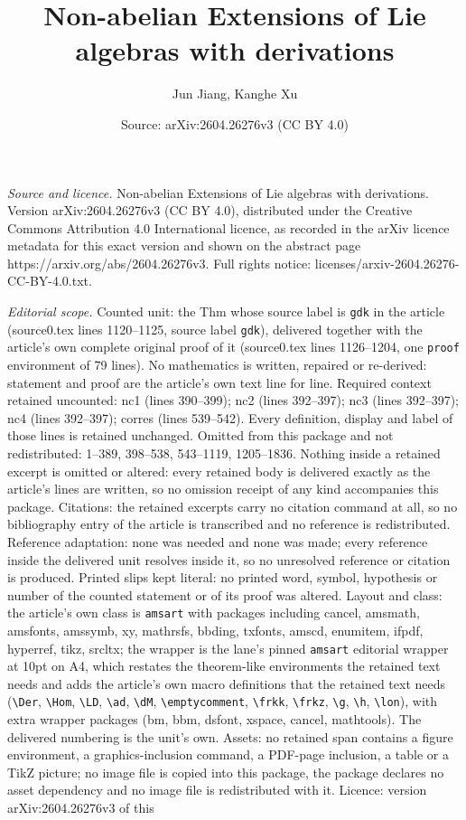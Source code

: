 \documentclass[10pt,a4paper]{amsart}
\title[Non-abelian Extensions of Lie algebras with derivations]{Non-abelian Extensions of Lie algebras with derivations}
\author{Jun Jiang, Kanghe Xu}
\date{Source: arXiv:2604.26276v3 (CC BY 4.0)}
\begin{document}
\maketitle

\noindent\emph{Source and licence.} Non-abelian Extensions of Lie algebras with derivations. Version arXiv:2604.26276v3 (CC BY 4.0), distributed under the Creative Commons Attribution 4.0 International licence, as recorded in the arXiv licence metadata for this exact version and shown on the abstract page https://arxiv.org/abs/2604.26276v3. Full rights notice: licenses/arxiv-2604.26276-CC-BY-4.0.txt.\par\smallskip

\noindent\textit{Editorial scope.} Counted unit: the Thm whose source label is \texttt{gdk} in the article (source0.tex lines 1120--1125, source label \texttt{gdk}), delivered together with the article's own complete original proof of it (source0.tex lines 1126--1204, one \texttt{proof} environment of 79 lines). No mathematics is written, repaired or re-derived: statement and proof are the article's own text line for line. Required context retained uncounted: nc1 (lines 390--399); nc2 (lines 392--397); nc3 (lines 392--397); nc4 (lines 392--397); corres (lines 539--542). Every definition, display and label of those lines is retained unchanged. Omitted from this package and not redistributed: 1--389, 398--538, 543--1119, 1205--1836. Nothing inside a retained excerpt is omitted or altered: every retained body is delivered exactly as the article's lines are written, so no omission receipt of any kind accompanies this package. Citations: the retained excerpts carry no citation command at all, so no bibliography entry of the article is transcribed and no reference is redistributed. Reference adaptation: none was needed and none was made; every reference inside the delivered unit resolves inside it, so no unresolved reference or citation is produced. Printed slips kept literal: no printed word, symbol, hypothesis or number of the counted statement or of its proof was altered. Layout and class: the article's own class is \texttt{amsart} with packages including cancel, amsmath, amsfonts, amssymb, xy, mathrsfs, bbding, txfonts, amscd, enumitem, ifpdf, hyperref, tikz, srcltx; the wrapper is the lane's pinned \texttt{amsart} editorial wrapper at 10pt on A4, which restates the theorem-like environments the retained text needs and adds the article's own macro definitions that the retained text needs (\texttt{\textbackslash Der}, \texttt{\textbackslash Hom}, \texttt{\textbackslash LD}, \texttt{\textbackslash ad}, \texttt{\textbackslash dM}, \texttt{\textbackslash emptycomment}, \texttt{\textbackslash frkk}, \texttt{\textbackslash frkz}, \texttt{\textbackslash g}, \texttt{\textbackslash h}, \texttt{\textbackslash lon}), with extra wrapper packages (bm, bbm, dsfont, xspace, cancel, mathtools). The delivered numbering is the unit's own. Assets: no retained span contains a figure environment, a graphics-inclusion command, a PDF-page inclusion, a table or a TikZ picture; no image file is copied into this package, the package declares no asset dependency and no image file is redistributed with it. Licence: version arXiv:2604.26276v3 of this 
\end{document}
